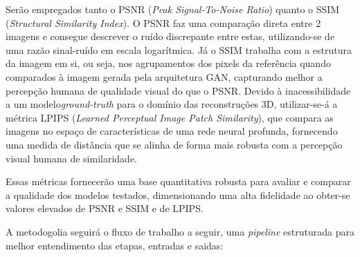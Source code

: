 Serão empregados tanto o PSNR (\textit{Peak Signal-To-Noise Ratio}) quanto o SSIM (\textit{Structural Similarity Index}). O PSNR faz uma comparação direta entre 2 imagens e consegue descrever o ruído discrepante entre estas, utilizando-se de uma razão sinal-ruído em escala logarítmica. Já o SSIM trabalha com a estrutura da imagem em si, ou seja, nos agrupamentos dos pixels da referência quando comparados à imagem gerada pela arquitetura GAN, capturando melhor a percepção humana de qualidade visual do que o PSNR. Devido à inacessibilidade a um modelo\textit{ground-truth} para o domínio das reconstruções 3D, utilizar-se-á a métrica LPIPS (\textit{Learned Perceptual Image Patch Similarity}), que compara as imagens no espaço de características de uma rede neural profunda, fornecendo uma medida de distância que se alinha de forma mais robusta com a percepção visual humana de similaridade.  

Essas métricas fornecerão uma base quantitativa robusta para avaliar e comparar a qualidade dos modelos testados, dimensionando uma alta fidelidade ao obter-se valores elevados de PSNR e SSIM e de LPIPS.


A metodogolia seguirá o fluxo de trabalho a seguir, uma \textit{pipeline} estruturada para melhor entendimento das etapas, entradas e saidas:


